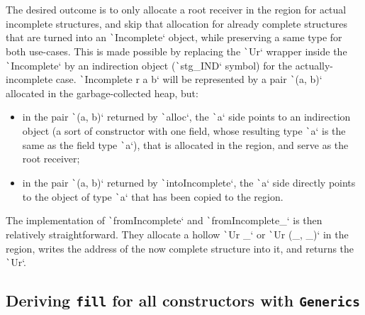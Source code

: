 \documentclass[english]{jflart}
\begin{document}
The desired outcome is to only allocate a root receiver in the region for actual incomplete structures, and skip that allocation for already complete structures that are turned into an \texttt`Incomplete` object, while preserving a same type for both use-cases. This is made possible by replacing the \texttt`Ur` wrapper inside the \texttt`Incomplete` by an 
indirection object (\texttt`stg_IND` symbol) for the actually-incomplete case. \texttt`Incomplete r a b` will be represented by a pair \texttt`(a, b)` allocated in the garbage-collected heap, but:
\begin{itemize}
  \item in the pair \texttt`(a, b)` returned by \texttt`alloc`, the \texttt`a` side points to an indirection object (a sort of constructor with one field, whose resulting type \texttt`a` is the same as the field type \texttt`a`), that is allocated in the region, and serve as the root receiver;
  \item in the pair \texttt`(a, b)` returned by \texttt`intoIncomplete`, the \texttt`a` side directly points to the object of type \texttt`a` that has been copied to the region.
\end{itemize}


The implementation of \texttt`fromIncomplete` and \texttt`fromIncomplete_` is then relatively straightforward. They allocate a hollow \texttt`Ur _` or \texttt`Ur (_, _)` in the region, writes the address of the now complete structure into it, and returns the \texttt`Ur`.

\subsection{Deriving \texttt{fill} for all constructors with \texttt{Generics}}

\end{document}
